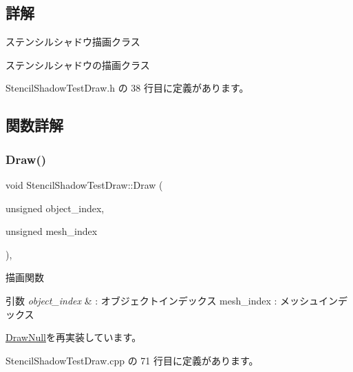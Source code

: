\subsection{詳解}
ステンシルシャドウ描画クラス 

ステンシルシャドウの描画クラス 

 Stencil\+Shadow\+Test\+Draw.\+h の 38 行目に定義があります。



\subsection{関数詳解}
\mbox{\label{class_stencil_shadow_test_draw_abb5f9445b7d94c213a3751fa57e36643}} 
\subsubsection{\texorpdfstring{Draw()}{Draw()}}
{\footnotesize\ttfamily void Stencil\+Shadow\+Test\+Draw\+::\+Draw (\begin{DoxyParamCaption}\item[{unsigned}]{object\+\_\+index,  }\item[{unsigned}]{mesh\+\_\+index }\end{DoxyParamCaption})\hspace{0.3cm}{\ttfamily [override]}, {\ttfamily [virtual]}}



描画関数 


\begin{DoxyParams}{引数}
{\em object\+\_\+index} & \+: オブジェクトインデックス mesh\+\_\+index \+: メッシュインデックス \\
\hline
\end{DoxyParams}


\mbox{\hyperlink{class_draw_null_afe50f6fd820b18d673f70f048743f339}{Draw\+Null}}を再実装しています。



 Stencil\+Shadow\+Test\+Draw.\+cpp の 71 行目に定義があります。

